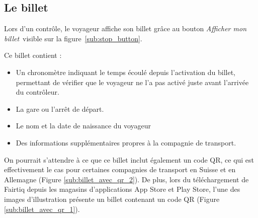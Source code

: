 \documentclass[a4paper]{article}
\begin{document}
\clearpage
\subsection{Le billet}

Lors d'un contrôle, le voyageur affiche son billet grâce au bouton \og \textit{Afficher mon billet}\fg\
visible sur la figure~\ref*{sub:stop_button}.

Ce billet contient :
\begin{itemize}
  \item Un chronomètre indiquant le temps écoulé depuis l'activation du billet,
        permettant de vérifier que le voyageur ne l'a pas activé juste avant l'arrivée du contrôleur.
  \item La gare ou l'arrêt de départ.
  \item Le nom et la date de naissance du voyageur
  \item Des informations supplémentaires propres à la compagnie de transport.
\end{itemize}

On pourrait s'attendre à ce que ce billet inclut également un code QR,
ce qui est effectivement le cas pour certaines compagnies de transport en Suisse
et en Allemagne (Figure \ref{sub:billet_avec_qr_2}).
De plus, lors du téléchargement de Fairtiq depuis les magasins d'applications
App Store et Play Store, l'une des images d'illustration présente un
billet contenant un code QR (Figure \ref*{sub:billet_avec_qr_1}).
\end{document}
